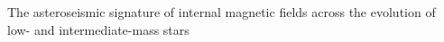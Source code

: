 The asteroseismic signature of internal magnetic fields across the evolution of low- and intermediate-mass stars
  